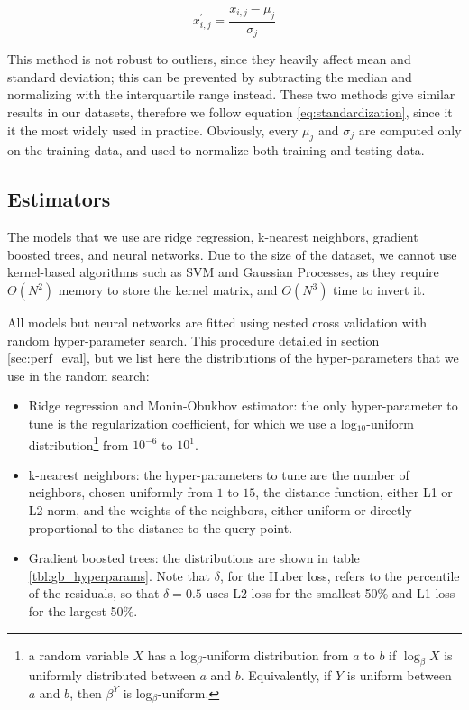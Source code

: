 \documentclass[a4paper]{book}
\begin{document}
\begin{equation}
\label{eq:standardization}
x^\prime_{i,j}=\frac{x_{i,j}-\mu_j}{\sigma_j}
\end{equation}

This method is not robust to outliers, since they heavily affect mean and standard deviation; this can be prevented by subtracting the median and normalizing with the interquartile range instead. These two methods give similar results in our datasets, therefore we follow equation \ref{eq:standardization}, since it it the most widely used in practice. Obviously, every $\mu_j$ and $\sigma_j$ are computed only on the training data, and used to normalize both training and testing data.

\subsection{Estimators}

The models that we use are ridge regression, k-nearest neighbors, gradient boosted trees, and neural networks. Due to the size of the dataset, we cannot use kernel-based algorithms such as SVM and Gaussian Processes, as they require $\Theta(N^2)$ memory to store the kernel matrix, and $O(N^3)$ time to invert it.

All models but neural networks are fitted using nested cross validation with random hyper-parameter search. This procedure detailed in section \ref{sec:perf_eval}, but we list here the distributions of the hyper-parameters that we use in the random search:

\begin{itemize}
\item Ridge regression and Monin-Obukhov estimator: the only hyper-parameter to tune is the regularization coefficient, for which we use a log$_{10}$-uniform distribution\footnote{a random variable $X$ has a log$_\beta$-uniform distribution from $a$ to $b$ if $\log_\beta X$ is uniformly distributed between $a$ and $b$. Equivalently, if $Y$ is uniform between $a$ and $b$, then $\beta^Y$ is log$_\beta$-uniform.} from $10^{-6}$ to $10^{1}$.

\item k-nearest neighbors: the hyper-parameters to tune are the number of neighbors, chosen uniformly from $1$ to $15$, the distance function, either L1 or L2 norm, and the weights of the neighbors, either uniform or directly proportional to the distance to the query point.

\item Gradient boosted trees: the distributions are shown in table \ref{tbl:gb_hyperparams}. Note that $\delta$, for the Huber loss, refers to the percentile of the residuals, so that $\delta=0.5$ uses L2 loss for the smallest 50\% and L1 loss for the largest 50\%.
\end{itemize}
\end{document}
